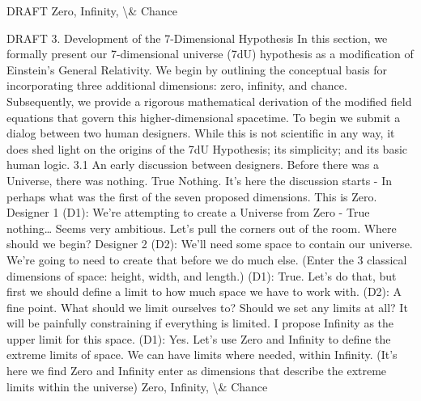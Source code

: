 \documentclass[12pt]{article}
\begin{document}
DRAFT
Zero, Infinity, \textbackslash{}& Chance

DRAFT
3. Development of the 7-Dimensional Hypothesis
In this section, we formally present our 7-dimensional universe (7dU) hypothesis as a
modiﬁcation of Einstein's General Relativity. We begin by outlining the conceptual basis
for incorporating three additional dimensions: zero, inﬁnity, and chance. Subsequently,
we provide a rigorous mathematical derivation of the modiﬁed ﬁeld equations that
govern this higher-dimensional spacetime.
To begin we submit a dialog between two human designers. While this is not scientiﬁc
in any way, it does shed light on the origins of the 7dU Hypothesis; its simplicity; and
its basic human logic.
3.1 An early discussion between designers.
Before there was a Universe, there was nothing. True Nothing. It’s here the discussion
starts - In perhaps what was the ﬁrst of the seven proposed dimensions. This is Zero.
Designer 1 (D1): We’re attempting to create a Universe from Zero - True nothing…
Seems very ambitious. Let’s pull the corners out of the room. Where should we begin?
Designer 2 (D2): We’ll need some space to contain our universe. We’re going to need
to create that before we do much else. (Enter the 3 classical dimensions of space:
height, width, and length.)
(D1): True. Let’s do that, but ﬁrst we should deﬁne a limit to how much space we have
to work with.
(D2): A ﬁne point. What should we limit ourselves to? Should we set any limits at all? It
will be painfully constraining if everything is limited. I propose Inﬁnity as the upper limit
for this space.
(D1): Yes. Let’s use Zero and Inﬁnity to deﬁne the extreme limits of space. We can have
limits where needed, within Inﬁnity. (It’s here we ﬁnd Zero and Inﬁnity enter as
dimensions that describe the extreme limits within the universe)
Zero, Infinity, \textbackslash{}& Chance
\end{document}
